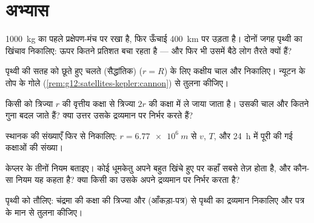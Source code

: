 \section{अभ्यास}

\begin{exercise}[$\star$]\label{exo:g12:satellites-kepler:1}
\qty{1000}{kg} का  पहले प्रक्षेपण-मंच पर रखा है, फिर ऊँचाई \qty{400}{km} पर
उड़ता है। दोनों जगह पृथ्वी का खिंचाव निकालिए: ऊपर कितने प्रतिशत बचा रहता है ---
और फिर भी उसमें बैठे लोग तैरते क्यों हैं?
\end{exercise}

\begin{exercise}[$\star$]\label{exo:g12:satellites-kepler:2}
पृथ्वी की सतह को छूते हुए चलते (सैद्धांतिक)  ($r = R$) के लिए
कक्षीय चाल और  निकालिए। न्यूटन के तोप के गोले (\cref{rem:g12:satellites-kepler:cannon}) से
तुलना कीजिए।
\end{exercise}

\begin{exercise}[$\star$]\label{exo:g12:satellites-kepler:3}
किसी  को त्रिज्या $r$ की वृत्तीय कक्षा से
त्रिज्या $2r$ की कक्षा में ले जाया जाता है। उसकी चाल और 
कितने गुना बदल जाते हैं? क्या उत्तर उसके द्रव्यमान पर निर्भर करते हैं?
\end{exercise}

\begin{exercise}[$\star$]\label{exo:g12:satellites-kepler:4}
स्थानक की संख्याएँ फिर से निकालिए: $r = \qty{6.77e6}{m}$ से $v$, $T$, और \qty{24}{h} में
पूरी की गई कक्षाओं की संख्या।
\end{exercise}

\begin{exercise}[$\star$]\label{exo:g12:satellites-kepler:5}
केप्लर के तीनों नियम बताइए। कोई धूमकेतु अपने बहुत खिंचे हुए 
पर कहाँ सबसे तेज़ होता है, और कौन-सा नियम यह कहता है? क्या किसी 
का  उसके अपने द्रव्यमान पर निर्भर करता है?
\end{exercise}

\begin{exercise}[$\star\star$]\label{exo:g12:satellites-kepler:6}
पृथ्वी को तौलिए: चंद्रमा की कक्षा की त्रिज्या और 
(आँकड़ा-पत्र) से पृथ्वी का द्रव्यमान निकालिए और पत्र के मान से तुलना कीजिए।
\end{exercise}

